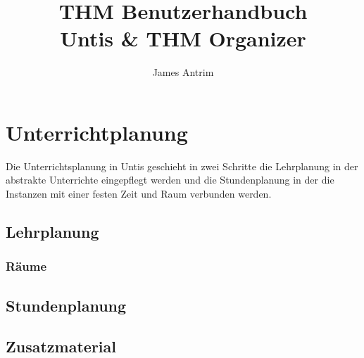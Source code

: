 \documentclass[]{report}
\title{THM Benutzerhandbuch \\Untis \& THM Organizer}
\author{James Antrim}
\begin{document}
\maketitle

\newpage
\thispagestyle{empty}
\section*{}

\newpage
\tableofcontents
\thispagestyle{empty}

\newpage
\setcounter{page}{1}




\chapter{Unterrichtplanung}

Die Unterrichtsplanung in Untis geschieht in zwei Schritte die Lehrplanung in der abstrakte Unterrichte eingepflegt werden und die Stundenplanung in der die Instanzen mit einer festen Zeit und Raum verbunden werden.

\section{Lehrplanung}
\label{sec:lehrplanung}


\subsection{Räume}
\label{subsec:rooms}

\section{Stundenplanung}




\begin{appendices}
\chapter{Zusatzmaterial}


	
\end{appendices}
\end{document}
